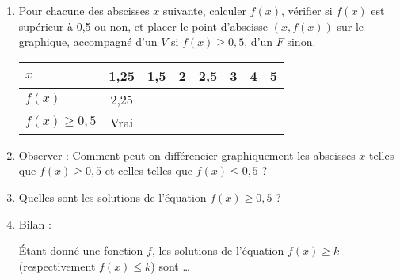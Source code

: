 \documentclass[12pt]{article}
\begin{document}
  \begin{enumerate}
    \item 
      Pour chacune des abscisses $x$ suivante, calculer $f(x)$, vérifier si $f(x)$ est supérieur à 0,5 ou non, et placer le point d'abscisse $\left( x, f(x) \right)$ sur le graphique, accompagné d'un $V$ si $f(x)\geq0,5$, d'un $F$ sinon.
      \begin{center}
        \begin{tabularx}{\linewidth}{p{2cm}||C|C|C|C|C|C|C}
          $x$ & 1,25 & 1,5 & 2 & 2,5 & 3 & 4 & 5 \\
          \hline
          \hline
          $f(x)$ & 2,25& & & & & & \\
          \hline
          $f(x)\geq0,5$ & Vrai & & & & & \\
        \end{tabularx}
      \end{center}
    \item Observer : Comment peut-on différencier graphiquement les abscisses $x$ telles que $f(x)\geq0,5$ et celles telles que $f(x)\leq0,5$ ?
    \item Quelles sont les solutions de l'équation $f(x)\geq0,5$ ?
    \item Bilan :
      \begin{framed}
        \begin{propriete}Étant donné une fonction $f$, les solutions de l'équation $f(x)\geq k$ (respectivement $f(x)\leq k$) sont \ldots

      \vspace{2cm}
        \end{propriete}
      \end{framed}
  \end{enumerate}
  
\end{document}
